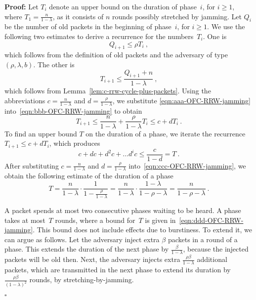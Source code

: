 \documentclass[11pt]{article}
\newcommand{\qed}{\hfill $\square$}
\newenvironment{proof}{\noindent\textbf{Proof: }}{\qed \smallbreak}
\begin{document}
\begin{proof}
Let $T_i$ denote an upper bound on the duration of phase~$i$, for $i\ge 1$, where $T_1=\frac{n}{1-\lambda}$, as it consists of $n$ rounds possibly stretched by jamming.
Let $Q_i$ be the number of old packets in the beginning of phase~$i$, for $i\ge 1$.
We use the following two estimates to derive a recurrence for the numbers~$T_i$.
One is
\begin{equation}
\label{eqn:aaa-OFC-RRW-jamming}
Q_{i+1}\le \rho T_i\ , 
\end{equation}
which follows from the definition of old packets and the adversary of type $(\rho,\lambda,b)$.
The other is
\begin{equation}
\label{eqn:bbb-OFC-RRW-jamming}
T_{i+1}\le \frac{Q_{i+1}+n}{1-\lambda} \ ,
\end{equation}
which follows from Lemma~\ref{lem:c-rrw-cycle-plus-packets}.  
Using the abbreviations $c=\frac{n}{1-\lambda}$ and $d=\frac{\rho}{1-\lambda}$, we substitute \eqref{eqn:aaa-OFC-RRW-jamming} into~\eqref{eqn:bbb-OFC-RRW-jamming} to obtain
\[
T_{i+1}
\le
\frac{n}{1-\lambda} + \frac{\rho }{1-\lambda} T_i
\le
c + d T_i\ .
\]
To find an upper bound $T$ on the duration of a phase, we iterate the recurrence $T_{i+1}\le c + d T_i$, which produces
\begin{equation}
\label{eqn:ccc-OFC-RRW-jamming}
 c+d c + d^2 c +\ldots d^i c\le \frac{c}{1-d} =T\ .
\end{equation}
After substituting $c=\frac{n}{1-\lambda}$ and $d=\frac{\rho}{1-\lambda}$ into~\eqref{eqn:ccc-OFC-RRW-jamming}, we obtain the following estimate of the duration of a phase
\begin{equation}
\label{eqn:ddd-OFC-RRW-jamming}
T =
\frac{n}{1-\lambda} \cdot \frac{1}{1-\frac{\rho}{1-\lambda}} 
=
\frac{n}{1-\lambda} \cdot \frac{1-\lambda}{1-\rho-\lambda} 
=
\frac{n}{1-\rho-\lambda}\ .
\end{equation}

A packet spends at most two consecutive phases waiting to be heard.
A phase takes at most~$T$ rounds, where a bound for~$T$ is given in~\eqref{eqn:ddd-OFC-RRW-jamming}.
This bound does not include effects due to burstiness.
To extend it, we can argue as follows.
Let the adversary inject extra $\beta$ packets in a round of a phase.
This extends the duration of the next phase by $\frac{\beta}{1-\lambda}$, because the injected packets will be old then.
Next, the adversary injects extra $\frac{\rho\beta}{1-\lambda}$ additional packets, which are transmitted in the next phase to extend its duration  by $ \frac{\rho\beta}{(1-\lambda)^2}$ rounds, by stretching-by-jamming.


\end{proof}
\end{document}
